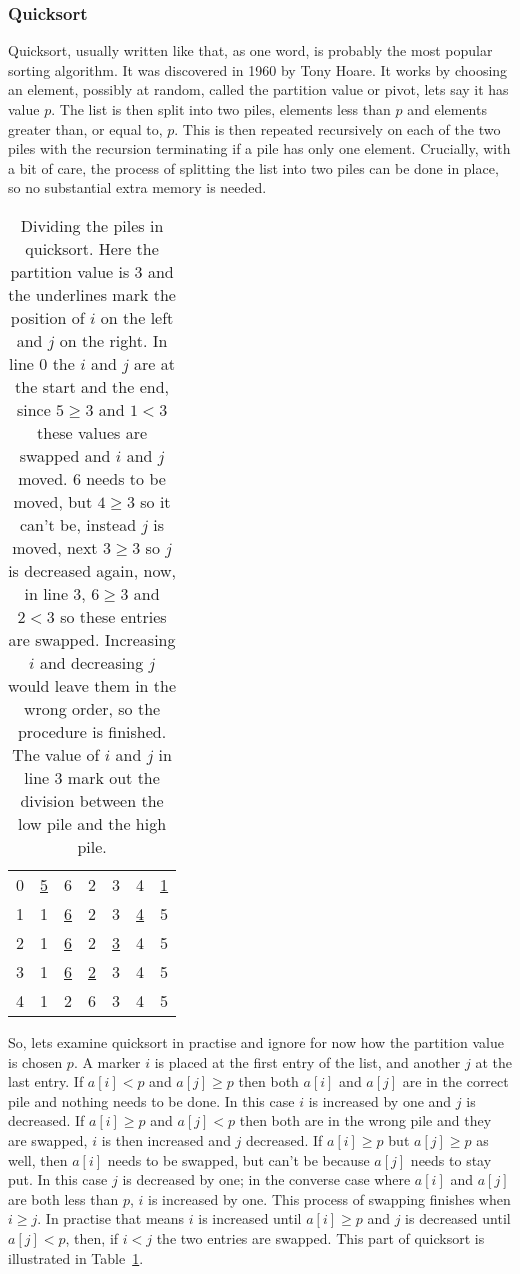 \documentclass[11pt,a4paper]{scrartcl}
\begin{document}
\subsubsection*{Quicksort}

Quicksort, usually written like that, as one word, is probably the
most popular sorting algorithm. It was discovered in 1960 by Tony
Hoare. It works by choosing an element, possibly at random, called the
partition value or pivot, lets say it has value $p$. The list is then
split into two piles, elements less than $p$ and elements greater
than, or equal to, $p$. This is then repeated recursively on each of
the two piles with the recursion terminating if a pile has only one
element. Crucially, with a bit of care, the process of splitting the
list into two piles can be done in place, so no substantial extra
memory is needed.

\begin{table}
\begin{tabular}{c|cccccc}
0&\underline{5}&6&2&3&4&\underline{1}\\
1&1&\underline{6}&2&3&\underline{4}&5\\
2&1&\underline{6}&2&\underline{3}&4&5\\
3&1&\underline{6}&\underline{2}&3&4&5\\
4&1&2&6&3&4&5\\
\end{tabular}
\caption{Dividing the piles in quicksort. Here the partition value is
  3 and the underlines mark the position of $i$ on the left and $j$ on
  the right. In line 0 the $i$ and $j$ are at the start and the end,
  since $5\ge 3$ and $1<3$ these values are swapped and $i$ and $j$
  moved. 6 needs to be moved, but $4\ge 3$ so it can't be, instead $j$
  is moved, next $3\ge 3$ so $j$ is decreased again, now, in line 3,
  $6\ge 3$ and $2<3$ so these entries are swapped. Increasing $i$ and
  decreasing $j$ would leave them in the wrong order, so the procedure
  is finished. The value of $i$ and $j$ in line 3 mark out the
  division between the low pile and the high
  pile.\label{table_quick_divide}}
\end{table}

So, lets examine quicksort in practise and ignore for now how the
partition value is chosen $p$. A marker $i$ is placed at the first
entry of the list, and another $j$ at the last entry. If $a[i]<p$ and
$a[j]\ge p$ then both $a[i]$ and $a[j]$ are in the correct pile and
nothing needs to be done. In this case $i$ is increased by one and $j$
is decreased. If $a[i]\ge p$ and $a[j]<p$ then both are in the wrong
pile and they are swapped, $i$ is then increased and $j$ decreased. If
$a[i]\ge p$ but $a[j]\ge p$ as well, then $a[i]$ needs to be swapped,
but can't be because $a[j]$ needs to stay put. In this case $j$ is
decreased by one; in the converse case where $a[i]$ and $a[j]$ are
both less than $p$, $i$ is increased by one. This process of swapping
finishes when $i\ge j$. In practise that means $i$ is increased until
$a[i]\ge p$ and $j$ is decreased until $a[j]<p$, then, if $i<j$ the
two entries are swapped. This part of quicksort is illustrated in
Table~\ref{table_quick_divide}.
\end{document}
